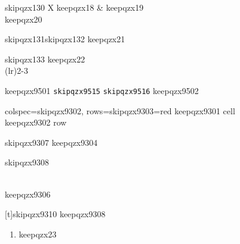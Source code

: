 \documentclass[skipqzxa]{article}
\begin{document}
\begin{tabularx}{\textwidth}{skipqzx130 X}
 \toprule keepqzx18 & keepqzx19 \\ \midrule keepqzx20 \\ \bottomrule
\end{tabularx}
\begin{tabulary}{skipqzx131}{skipqzx132} keepqzx21 \end{tabulary}
\begin{tabular}{skipqzx133} keepqzx22 \\ \cmidrule[skipqzx134](lr){2-3} \end{tabular}
 keepqzx9501
 \cites(skipqzx9508)(skipqzx9509)[skipqzx9510][skipqzx9511]{skipqzx9512}[skipqzx9513]{skipqzx9514}
\lstinline{skipqzx9515} \lstinline[language=C]{skipqzx9516} keepqzx9502  
   
\begin{tblr}{colspec={skipqzx9302}, rows={skipqzx9303=red}}  keepqzx9301 cell \\  keepqzx9302 row \end{tblr}
\begin{longtblr}[caption={skipqzx9311}]{skipqzx9307} keepqzx9304 \end{longtblr}
\begin{longtable}[c]{skipqzx9308} \caption{keepqzx9305 long} \\ \toprule keepqzx9306 \endfirsthead {} \\ \endhead \end{longtable}
\begin{tabularx}{\textwidth}[t]{skipqzx9310} keepqzx9308 \end{tabularx}

  
 
 
\begin{enumerate}[label=skipqzx160, leftmargin=*] \item keepqzx23 \end{enumerate}
\end{document}

